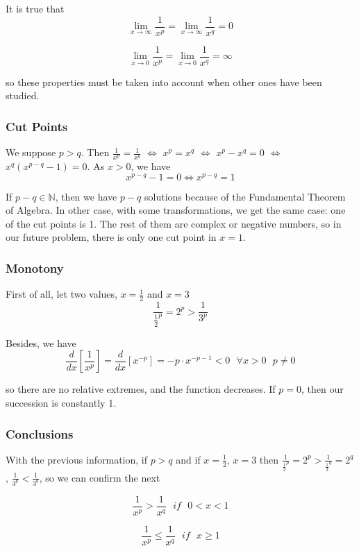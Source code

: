 \documentclass{article}
\begin{document}
It is true that
\[
\lim_{{x \to \infty}} \frac{1}{{x^p}}=\lim_{{x \to \infty}} \frac{1}{{x^q}}=0
\]

\[
\lim_{{x \to 0}} \frac{1}{{x^p}}=\lim_{{x \to 0}} \frac{1}{{x^q}}=\infty
\]

so these properties must be taken into account when other ones have been studied.

\subsubsection{Cut Points}

We suppose $p > q$. Then $\frac{1}{{x^p}}=\frac{1}{x^q}$ $\Leftrightarrow$ ${x^p}={x^q}$ $\Leftrightarrow$ ${x^p}-{x^q}=0$ $\Leftrightarrow$ ${x^q}({x^{p-q}}-1)=0$. As $x>0$, we have
\[
{x^{p-q}}-1=0 \Leftrightarrow {x^{p-q}}=1
\]

If ${p-q} \in \mathbb{N}$, then we have $p-q$ solutions because of the Fundamental Theorem of Algebra. In other case, with some transformations, we get the same case: one of the cut points is 1. The rest of them are complex or negative numbers, so in our future problem, there is only one cut point in $x=1$.

\subsubsection{Monotony}

First of all, let two values, $x=\frac{1}{2}$ and $x=3$
\[
	\frac{1}{\frac{1}{2}^p}={2^p} > \frac{1}{3^p}
\]

Besides, we have
\[
	\frac{d}{dx}\left[ \frac{1}{{x^p}} \right] = \frac{d}{dx}\left[x^{-p} \right] = -p \cdot x^{-p-1} < 0 \textbf{ } \forall x>0 \textbf{ } p\neq 0
\]

so there are no relative extremes, and the function decreases. If \(p = 0\), then our succession is constantly 1.

\subsubsection{Conclusions}

With the previous information, if $p>q$ and if $x=\frac{1}{2}$, $x=3$ then $\frac{1}{\frac{1}{2}^p}={2^p} > \frac{1}{\frac{1}{2}^q}={2^q}$, $\frac{1}{3^p} < \frac{1}{3^q}$, so we can confirm the next

\[
	\frac{1}{{x^p}} > \frac{1}{{x^q}} \textbf{ } if \textbf{ } 0<x<1
\]

\[
	\frac{1}{{x^p}} \leq \frac{1}{{x^q}} \textbf{ } if \textbf{ } x \geq 1
\]
\end{document}
